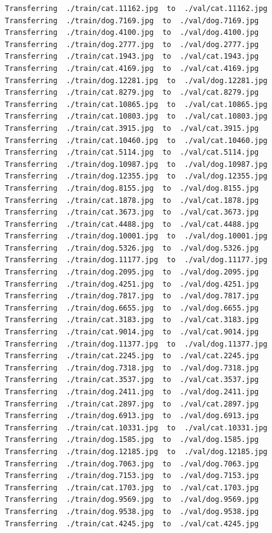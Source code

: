 \documentclass[]{book}
\theoremstyle{definition}
\theoremstyle{definition}
\theoremstyle{definition}
\theoremstyle{remark}
\begin{document}
\begin{verbatim}
Transferring  ./train/cat.11162.jpg  to  ./val/cat.11162.jpg
Transferring  ./train/dog.7169.jpg  to  ./val/dog.7169.jpg
Transferring  ./train/dog.4100.jpg  to  ./val/dog.4100.jpg
Transferring  ./train/dog.2777.jpg  to  ./val/dog.2777.jpg
Transferring  ./train/cat.1943.jpg  to  ./val/cat.1943.jpg
Transferring  ./train/cat.4169.jpg  to  ./val/cat.4169.jpg
Transferring  ./train/dog.12281.jpg  to  ./val/dog.12281.jpg
Transferring  ./train/cat.8279.jpg  to  ./val/cat.8279.jpg
Transferring  ./train/cat.10865.jpg  to  ./val/cat.10865.jpg
Transferring  ./train/cat.10803.jpg  to  ./val/cat.10803.jpg
Transferring  ./train/cat.3915.jpg  to  ./val/cat.3915.jpg
Transferring  ./train/cat.10460.jpg  to  ./val/cat.10460.jpg
Transferring  ./train/cat.5114.jpg  to  ./val/cat.5114.jpg
Transferring  ./train/dog.10987.jpg  to  ./val/dog.10987.jpg
Transferring  ./train/dog.12355.jpg  to  ./val/dog.12355.jpg
Transferring  ./train/dog.8155.jpg  to  ./val/dog.8155.jpg
Transferring  ./train/cat.1878.jpg  to  ./val/cat.1878.jpg
Transferring  ./train/cat.3673.jpg  to  ./val/cat.3673.jpg
Transferring  ./train/cat.4488.jpg  to  ./val/cat.4488.jpg
Transferring  ./train/dog.10001.jpg  to  ./val/dog.10001.jpg
Transferring  ./train/dog.5326.jpg  to  ./val/dog.5326.jpg
Transferring  ./train/dog.11177.jpg  to  ./val/dog.11177.jpg
Transferring  ./train/dog.2095.jpg  to  ./val/dog.2095.jpg
Transferring  ./train/dog.4251.jpg  to  ./val/dog.4251.jpg
Transferring  ./train/dog.7817.jpg  to  ./val/dog.7817.jpg
Transferring  ./train/dog.6655.jpg  to  ./val/dog.6655.jpg
Transferring  ./train/cat.3183.jpg  to  ./val/cat.3183.jpg
Transferring  ./train/cat.9014.jpg  to  ./val/cat.9014.jpg
Transferring  ./train/dog.11377.jpg  to  ./val/dog.11377.jpg
Transferring  ./train/cat.2245.jpg  to  ./val/cat.2245.jpg
Transferring  ./train/dog.7318.jpg  to  ./val/dog.7318.jpg
Transferring  ./train/cat.3537.jpg  to  ./val/cat.3537.jpg
Transferring  ./train/dog.2411.jpg  to  ./val/dog.2411.jpg
Transferring  ./train/cat.2897.jpg  to  ./val/cat.2897.jpg
Transferring  ./train/dog.6913.jpg  to  ./val/dog.6913.jpg
Transferring  ./train/cat.10331.jpg  to  ./val/cat.10331.jpg
Transferring  ./train/dog.1585.jpg  to  ./val/dog.1585.jpg
Transferring  ./train/dog.12185.jpg  to  ./val/dog.12185.jpg
Transferring  ./train/dog.7063.jpg  to  ./val/dog.7063.jpg
Transferring  ./train/dog.7153.jpg  to  ./val/dog.7153.jpg
Transferring  ./train/cat.1703.jpg  to  ./val/cat.1703.jpg
Transferring  ./train/dog.9569.jpg  to  ./val/dog.9569.jpg
Transferring  ./train/dog.9538.jpg  to  ./val/dog.9538.jpg
Transferring  ./train/cat.4245.jpg  to  ./val/cat.4245.jpg

\end{verbatim}
\end{document}
